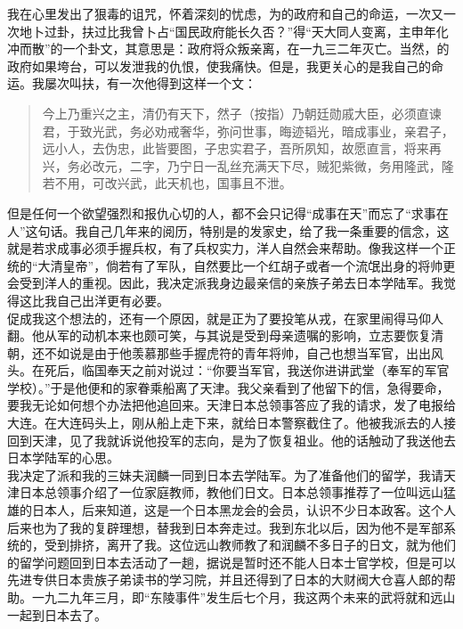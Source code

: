 我在心里发出了狠毒的诅咒，怀着深刻的忧虑，为的政府和自己的命运，一次又一次地卜过卦，扶过比我曾卜占“国民政府能长久否？”得“天大同人变离，主申年化冲而散”的一个卦文，其意思是：政府将众叛亲离，在一九三二年灭亡。当然，的政府如果垮台，可以发泄我的仇恨，使我痛快。但是，我更关心的是我自己的命运。我屡次叫扶，有一次他得到这样一个文：\\

\begin{quote}
	今上乃重兴之主，清仍有天下，然子（按指）乃朝廷勋戚大臣，必须直谏君，于致光武，务必劝戒奢华，弥问世事，晦迹韬光，暗成事业，亲君子，远小人，去伪忠，此皆要图，子忠实君子，吾所夙知，故愿直言，将来再兴，务必改元，二字，乃宁日一乱丝充满天下尽，贼犯紫微，务用隆武，隆若不用，可改兴武，此天机也，国事且不泄。\\
\end{quote}

但是任何一个欲望强烈和报仇心切的人，都不会只记得“成事在天”而忘了“求事在人”这句话。我自己几年来的阅历，特别是的发家史，给了我一条重要的信念，这就是若求成事必须手握兵权，有了兵权实力，洋人自然会来帮助。像我这样一个正统的“大清皇帝”，倘若有了军队，自然要比一个红胡子或者一个流氓出身的将帅更会受到洋人的重视。因此，我决定派我身边最亲信的亲族子弟去日本学陆军。我觉得这比我自己出洋更有必要。\\

促成我这个想法的，还有一个原因，就是正为了要投笔从戎，在家里闹得马仰人翻。他从军的动机本来也颇可笑，与其说是受到母亲遗嘱的影响，立志要恢复清朝，还不如说是由于他羡慕那些手握虎符的青年将帅，自己也想当军官，出出风头。在死后，临国奉天之前对说过：“你要当军官，我送你进讲武堂（奉军的军官学校）。”于是他便和的家眷乘船离了天津。我父亲看到了他留下的信，急得要命，要我无论如何想个办法把他追回来。天津日本总领事答应了我的请求，发了电报给大连。在大连码头上，刚从船上走下来，就给日本警察截住了。他被我派去的人接回到天津，见了我就诉说他投军的志向，是为了恢复祖业。他的话触动了我送他去日本学陆军的心思。\\

我决定了派和我的三妹夫润麟一同到日本去学陆军。为了准备他们的留学，我请天津日本总领事介绍了一位家庭教师，教他们日文。日本总领事推荐了一位叫远山猛雄的日本人，后来知道，这是一个日本黑龙会的会员，认识不少日本政客。这个人后来也为了我的复辟理想，替我到日本奔走过。我到东北以后，因为他不是军部系统的，受到排挤，离开了我。这位远山教师教了和润麟不多日子的日文，就为他们的留学问题回到日本去活动了一趟，据说是暂时还不能人日本士官学校，但是可以先进专供日本贵族子弟读书的学习院，并且还得到了日本的大财阀大仓喜人郎的帮助。一九二九年三月，即“东陵事件”发生后七个月，我这两个未来的武将就和远山一起到日本去了。
